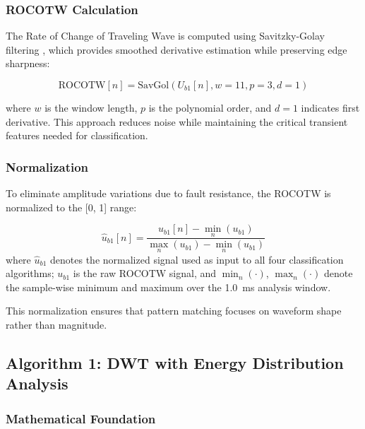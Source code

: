 \documentclass[journal]{IEEEtran}
\begin{document}
\subsubsection{ROCOTW Calculation}

The Rate of Change of Traveling Wave is computed using Savitzky-Golay filtering \cite{savitzky1964}, which provides smoothed derivative estimation while preserving edge sharpness:

\begin{equation}
\text{ROCOTW}[n] = \text{SavGol}\left(U_{b1}[n], w=11, p=3, d=1\right)
\end{equation}

where $w$ is the window length, $p$ is the polynomial order, and $d=1$ indicates first derivative. This approach reduces noise while maintaining the critical transient features needed for classification.

\subsubsection{Normalization}

To eliminate amplitude variations due to fault resistance, the ROCOTW is normalized to the [0, 1] range:

\begin{equation}
\hat{u}_{b1}[n] = \frac{u_{b1}[n] - \min_n(u_{b1})}{\max_n(u_{b1}) - \min_n(u_{b1})}
\end{equation}
where $\hat{u}_{b1}$ denotes the normalized signal used as input to all
four classification algorithms; $u_{b1}$ is the raw ROCOTW signal,
and $\min_n(\cdot)$, $\max_n(\cdot)$ denote the sample-wise minimum
and maximum over the 1.0~ms analysis window.

This normalization ensures that pattern matching focuses on waveform shape rather than magnitude.


\subsection{Algorithm 1: DWT with Energy Distribution Analysis}

\subsubsection{Mathematical Foundation}
\end{document}
